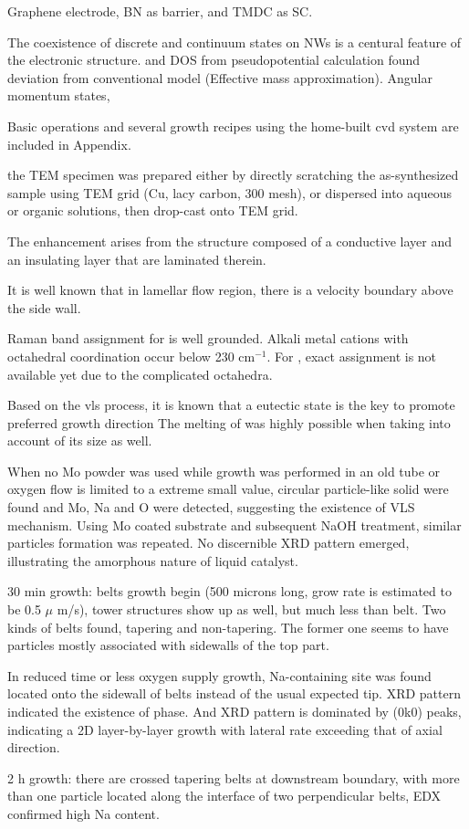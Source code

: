 Graphene electrode, BN as barrier, and TMDC as SC.\cite{Withers2015} 

The coexistence of discrete and continuum states on NWs is a centural feature of the electronic structure.  and DOS from pseudopotential calculation found deviation from conventional model (Effective mass approximation). Angular momentum states,  \cite{Wang2014n}


Basic operations and several growth recipes using the home-built \gls{cvd} system are included in Appendix.

the TEM specimen was prepared either by directly scratching the as-synthesized sample using TEM grid (Cu, lacy carbon, 300 mesh), or dispersed into aqueous or organic solutions, then drop-cast onto TEM grid. 


The enhancement arises from the structure composed of a conductive layer and an insulating layer that are laminated therein.\cite{Shingaya2013}

It is well known that in lamellar flow region, there is a velocity boundary above the side wall.

Raman band assignment for  is well grounded. Alkali metal cations with octahedral coordination occur below 230 cm$^{-1}$. For , exact assignment is not available yet due to the complicated  octahedra.

Based on the \gls{vls} process, it is known that a eutectic state is the key to promote preferred growth direction
The melting of  was highly possible when taking into account of its size as well.\cite{Bruggemann1997} 


\item When no Mo powder was used while growth was performed in an old tube or oxygen flow is limited to a extreme small value, circular particle-like solid were found and Mo, Na and O were detected, suggesting the existence of VLS mechanism. Using Mo coated substrate and subsequent NaOH treatment, similar particles formation was repeated. No discernible XRD pattern emerged, illustrating the amorphous nature of liquid catalyst.
\item 30 min growth: belts growth begin (500 microns long, grow rate is estimated to be 0.5 $\mu$ m/s), tower structures show up as well, but much less than belt. Two kinds of belts found, tapering and non-tapering. The former one seems to have particles mostly associated with sidewalls of the top part.
\item In reduced time or less oxygen supply growth, Na-containing site was found located onto the sidewall of belts instead of the usual expected tip. XRD pattern indicated the existence of  phase. And  XRD pattern is dominated by (0k0) peaks, indicating a 2D layer-by-layer growth with lateral rate exceeding that of axial direction.
\item 2 h growth: there are crossed tapering belts at downstream boundary, with more than one particle located along the interface of two perpendicular belts, EDX confirmed high Na content.



